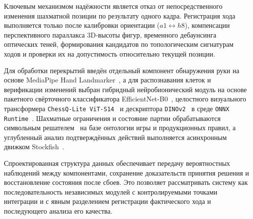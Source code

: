 Ключевым механизмом надёжности является отказ от непосредственного изменения шахматной позиции по результату одного кадра. Регистрация хода выполняется только после калибровки ориентации ($a1 \leftrightarrow h8$), компенсации перспективного параллакса 3D-высоты фигур, временного дебаунсинга оптических теней, формирования кандидатов по топологическим сигнатурам ходов и проверки их на допустимость относительно текущей позиции. 

Для обработки перекрытий введён отдельный компонент обнаружения руки на основе MediaPipe Hand Landmarker~\cite{Lugaresi2019}, а для распознавания клеток и верификации изменений выбран гибридный нейробионический модуль на основе пакетного свёрточного классификатора EfficientNet-B0~\cite{Wolflein2021}, целостного визуального трансформера \texttt{ChessQ-Lite ViT-S14}~\cite{Dosovitskiy2021} и дескриптора \texttt{DINOv2}~\cite{Oquab2024} в среде \texttt{ONNX Runtime}~\cite{ONNXRuntime2021}. Шахматные ограничения и состояние партии обрабатываются символьным решателем~\cite{Fiekas2024} на базе онтологии игры и продукционных правил, а углубленный анализ подтверждённых действий выполняется асинхронным движком Stockfish~\cite{Romstad2024}.

Спроектированная структура данных обеспечивает передачу вероятностных наблюдений между компонентами, сохранение доказательств принятия решения и восстановление состояния после сбоев. Это позволяет рассматривать систему как последовательность независимых модулей с контролируемыми точками интеграции и с явным разделением регистрации фактического хода и последующего анализа его качества.
